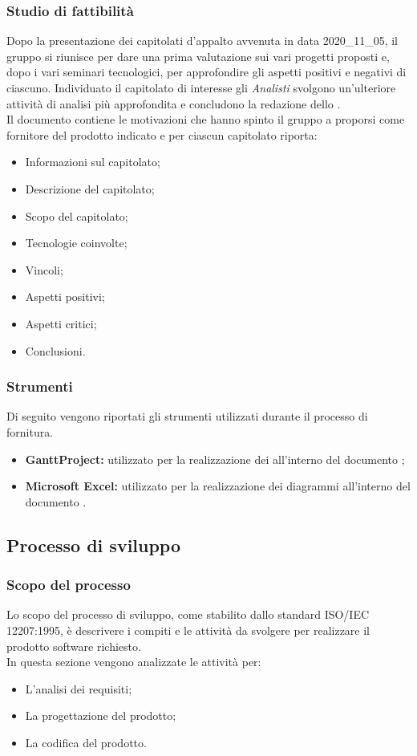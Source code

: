 \subsubsection{Studio di fattibilità}\label{SdF}
Dopo la presentazione dei capitolati d'appalto avvenuta in data 2020\_11\_05, il gruppo si riunisce per dare una prima valutazione sui vari progetti proposti e, dopo i vari seminari tecnologici, per approfondire gli aspetti positivi e negativi di ciascuno. Individuato il capitolato di interesse gli \textit{Analisti} svolgono un'ulteriore attività di analisi più approfondita e concludono la redazione dello \SdF{}.\\
Il documento contiene le motivazioni che hanno spinto il gruppo a proporsi come fornitore del prodotto indicato e per ciascun capitolato riporta:
\begin{itemize}
\item Informazioni sul capitolato;
\item Descrizione del capitolato;
\item Scopo del capitolato;
\item Tecnologie coinvolte; 
\item Vincoli;
\item Aspetti positivi;
\item Aspetti critici;
\item Conclusioni.
\end{itemize}

\subsubsection{Strumenti}\label{PF_Strumenti}
Di seguito vengono riportati gli strumenti utilizzati durante il processo di fornitura.
\begin{itemize}
	\item \textbf{GanttProject:} utilizzato per la realizzazione dei  all'interno del documento ;
	\item \textbf{Microsoft Excel:} utilizzato per la realizzazione dei diagrammi all'interno del documento .
\end{itemize}
\newpage

\subsection{Processo di sviluppo}
\subsubsection{Scopo del processo}\label{PS_Scopo}
Lo scopo del processo di sviluppo, come stabilito dallo standard ISO/IEC 12207:1995, è descrivere i compiti e le attività da svolgere per realizzare il prodotto software richiesto.\\
In questa sezione vengono analizzate le attività per:
\begin{itemize}
	\item L'analisi dei requisiti;
	\item La progettazione del prodotto;
	\item La codifica del prodotto.
\end{itemize}

